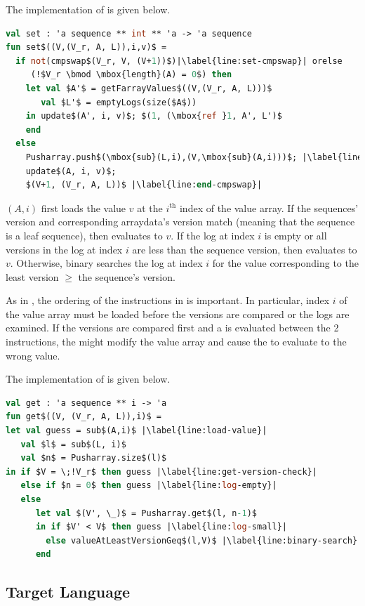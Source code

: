 The implementation of \set{} is given below.

\begin{lstlisting}[language=ML,escapechar=|]
val set : 'a sequence ** int ** 'a -> 'a sequence
fun set$((V,(V_r, A, L)),i,v)$ = 
  if not(cmpswap$(V_r, V, (V+1))$)|\label{line:set-cmpswap}| orelse
     (!$V_r \bmod \mbox{length}(A) = 0$) then
    let val $A'$ = getFarrayValues$((V,(V_r, A, L)))$
       val $L'$ = emptyLogs(size($A$))
    in update$(A', i, v)$; $(1, (\mbox{ref }1, A', L')$ 
    end
  else
    Pusharray.push$(\mbox{sub}(L,i),(V,\mbox{sub}(A,i)))$; |\label{line:start-cmpswap}|
    update$(A, i, v)$;
    $(V+1, (V_r, A, L))$ |\label{line:end-cmpswap}|
\end{lstlisting}

\get{}$(A,i)$ first loads the value $v$ at the $i^{\text{th}}$ index of the value array. If the sequences' version and corresponding arraydata's version match (meaning that the sequence is a leaf sequence), then \get{} evaluates to $v$. If the log at index $i$ is empty or all versions in the log at index $i$ are less than the sequence version, then \get{} evaluates to $v$. Otherwise, \get{} binary searches the log at index $i$ for the value corresponding to the least version $\geq$ the sequence's version.

As in \set{}, the ordering of the instructions in \get{} is important. In particular, index $i$ of the value array must be loaded before the versions are compared or the logs are examined. If the versions are compared first and a \set{} is evaluated between the 2 instructions, the \set{} might modify the value array and cause the \get{} to evaluate to the wrong value.

The implementation of \get{} is given below.

\begin{lstlisting}[language=ML,escapechar=|]
val get : 'a sequence ** i -> 'a
fun get$((V, (V_r, A, L)),i)$ =
let val guess = sub$(A,i)$ |\label{line:load-value}|
   val $l$ = sub$(L, i)$
   val $n$ = Pusharray.size$(l)$
in if $V = \;!V_r$ then guess |\label{line:get-version-check}|
   else if $n = 0$ then guess |\label{line:log-empty}|
   else
      let val $(V', \_)$ = Pusharray.get$(l, n-1)$
      in if $V' < V$ then guess |\label{line:log-small}|
        else valueAtLeastVersionGeq$(l,V)$ |\label{line:binary-search}|
      end
\end{lstlisting}

\subsection{Target Language}

